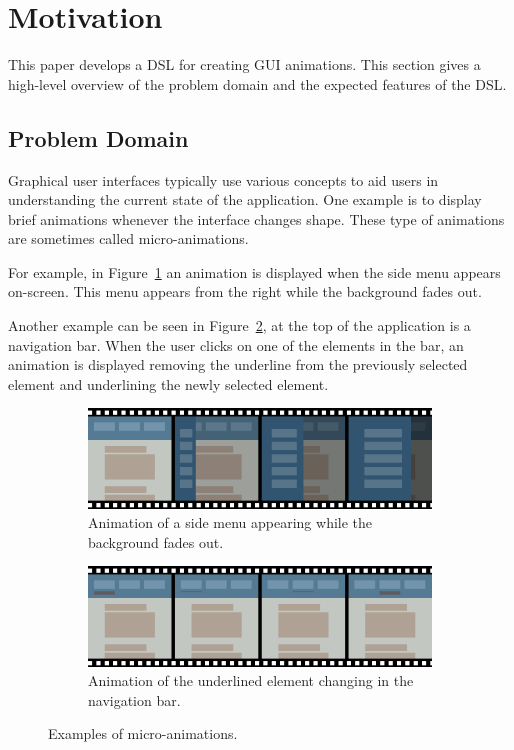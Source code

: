 \section{Motivation}
\label{sec:motivation}

This paper develops a DSL for creating GUI animations. This section gives a high-level overview of the problem domain and the expected features of the DSL.

\subsection{Problem Domain}

Graphical user interfaces typically use various concepts to aid users in understanding the current state of the application. One example is to display brief animations whenever the interface changes shape. These type of animations are sometimes called micro-animations.

For example, in Figure~\ref{fig:usecase1} an animation is displayed when the side menu appears on-screen. This menu appears from the right while the background fades out.

Another example can be seen in Figure~\ref{fig:usecase2}, at the top of the application is a navigation bar. When the user clicks on one of the elements in the bar, an animation is displayed removing the underline from the previously selected element and underlining the newly selected element.

\begin{figure}[h]
\centering

\begin{subfigure}[h]{\textwidth}
\centering
\includegraphics[width=\figscale\textwidth]{pictures/usecase1fig}
\caption{Animation of a side menu appearing while the background fades out.}
\label{fig:usecase1}
\end{subfigure}

\begin{subfigure}[h]{\textwidth}
\centering
\includegraphics[width=\figscale\textwidth]{pictures/usecase2fig}
\caption{Animation of the underlined element changing in the navigation bar.}
\label{fig:usecase2}
\end{subfigure}

\caption{Examples of micro-animations.}
\label{fig:usecase1basic}
\end{figure}

